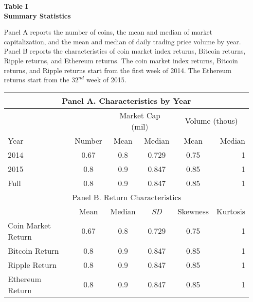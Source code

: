 \documentclass{article}
\begin{document}
    \begin{center}
        \textbf{
        Table I
        \\
        Summary Statistics
        }
        \begin{justify}
            \footnotesize{
            Panel A reports the number of coins, the mean and median of market capitalization, and the mean and median of daily trading price volume by year. Panel B reports the characteristics of coin market index returns, Bitcoin returns, Ripple returns, and Ethereum returns. The coin market index returns, Bitcoin returns, and Ripple returns start from the first week of 2014. The Ethereum returns start from the $32^{nd}$ week of 2015.
            }
        \end{justify}
        \-
        \begin{tabular}{lccccr}
            \toprule
            \multicolumn{6}{c}{Panel A. Characteristics by Year} \\
            \midrule
            \multicolumn{2}{c}{} & 
            \multicolumn{2}{c}{Market Cap (mil)} &
            \multicolumn{2}{c}{Volume (thous)}
            \\
            \cmidrule(lr){3-4} \cmidrule(lr){5-6} 
            Year & Number & Mean & Median & Mean & Median
            \\
            \midrule
            2014 & 0.67  & 0.8 & 0.729  & 0.75 & 1
            \\
            2015 & 0.8 & 0.9 & 0.847 & 0.85 & 1
            \\[0.2cm]
            Full & 0.8 & 0.9 & 0.847 & 0.85 & 1
            \\
            \midrule
            \multicolumn{6}{c}{Panel B. Return Characteristics} \\
            \midrule
            {} & Mean & Median & \textit{SD} & Skewness & Kurtosis
            \\
            \midrule
            Coin Market Return & 0.67  & 0.8 & 0.729  & 0.75 & 1
            \\
            Bitcoin Return & 0.8 & 0.9 & 0.847 & 0.85 & 1
            \\
            Ripple Return & 0.8 & 0.9 & 0.847 & 0.85 & 1
            \\
            Ethereum Return & 0.8 & 0.9 & 0.847 & 0.85 & 1
            \\
            \bottomrule
        \end{tabular}
    \end{center}
\end{document}
